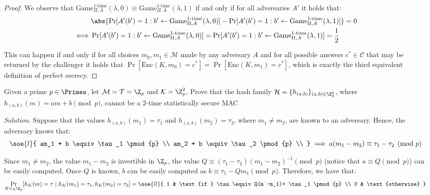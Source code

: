 \documentclass[a4paper, 12pt]{report}
\begin{document}
    \begin{proof}
        We observe that $\mathrm{Game}_{\Pi,A}^{\text{1-time}}(\lambda, 0) \equiv \mathrm{Game}_{\Pi,A}^{\text{1-time}}(\lambda, 1)$ if and only if for all adversaries $A'$ it holds that:
        \[\begin{split}
            & \abs{\Pr[A'(b') = 1 : b' \gets \mathrm{Game}_{\Pi,A}^{\text{1-time}}(\lambda, 0)] - \Pr[A'(b') = 1 : b' \gets \mathrm{Game}_{\Pi,A}^{\text{1-time}}(\lambda, 1)]} = 0 \\
            \iff & \Pr[A'(b') = 1 : b' \gets \mathrm{Game}_{\Pi,A}^{\text{1-time}}(\lambda, 0)] = \Pr[A'(b') = 1 : b' \gets \mathrm{Game}_{\Pi,A}^{\text{1-time}}(\lambda, 1)] = \frac{1}{2}
        \end{split}\]

        This can happen if and only if for all choices $m_0,m_1 \in \mathcal{M}$ made by any adversary $A$ and for all possible answers $c^* \in \mathcal{C}$ that may be returned by the challenger it holds that $\Pr[\mathrm{Enc}(K,m_0) = c^*] = \Pr[\mathrm{Enc}(K, m_1) = c^*]$, which is exactly the third equivalent definition of perfect secrecy.
    \end{proof}

    \begin{framedprob}{}
        Given a prime $p \in \Primes$, let $\mathcal{M} = \mathcal{T} = \Z_p$ and $\mathcal{K} = \Z_p^2$. Prove that the hash family $\mathcal{H} = \{h_{(a,b)}\}_{(a,b) \in \Z_p^2}$, where $h_{(a,b)}(m) = am+b \pmod{p}$, cannot be a $2$-time statistically secure MAC
    \end{framedprob}

    \textit{Solution}. Suppose that the values $h_{(a,b)}(m_1) = \tau_1$ and $h_{(a,b)}(m_2) = \tau_2$, where $m_1 \neq m_2$, are known to an adversary. Hence, the adversary knows that:
    \[\soe{l}{
        am_1 + b \equiv \tau_1 \pmod{p} \\
        am_2 + b \equiv \tau_2 \pmod{p} \\
    } \implies a(m_1-m_2) \equiv \tau_1 - \tau_2 \pmod{p}\]

    Since $m_1 \neq m_2$, the value $m_1 - m_2$ is invertible in $\Z_p$, the value $Q \equiv (\tau_1 - \tau_2)(m_1 - m_2)^{-1} \pmod{p}$ (notice that $a \equiv Q \pmod{p}$) can be easily computed. Once $Q$ is known, $b$ can be easily computed as $b \equiv \tau_1 - Qm_1 \pmod{p}$. Therefore, we have that:
    \[\Pr_{K \in_R \Z_p}[h_K(m) = \tau \mid h_K(m_1) = \tau_1, h_K(m_2) = \tau_2] = \soe{ll}{
        1 & \text{if } \tau \equiv Q(m -m_1)+ \tau_1 \pmod{p} \\
        0 & \text{otherwise}
    }\]
    
\end{document}
